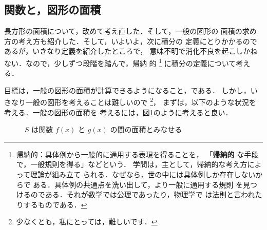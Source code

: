             \subsection{関数と，図形の面積}
                長方形の面積について，改めて考え直した．そして，一般の図形の
                面積の求め方の考え方も紹介した．そして，いよいよ，次に積分の
                定義にとりかかるのであるが，いきなり定義を紹介したところで，
                意味不明で消化不良を起こしかねない．なので，少しずつ段階を踏んで，帰納
                的
                    \footnote{
                        帰納的：具体例から一般的に通用する表現を得ることを，
                        「\textbf{帰納的} な手段で，一般規則を得る」などという．
                        学問は，主として，帰納的な考え方によって理論が組み立て
                        られる．なぜなら，世の中には具体例しか存在しないからで
                        ある．具体例の共通点を洗い出して，より一般に通用する規則
                        を見つけるのである．それが数学では公理であったり，物理学で
                        は法則と言われたりするものである．
                    }
                に積分の定義について考える．

                目標は，一般の図形の面積が計算できるようになること，である．
                しかし，いきなり一般の図形を考えることは難しいので
                    \footnote{
                        少なくとも，私にとっては，難しいです．
                    }，
                まずは，以下のような状況を考える．一般の図形の面積を
                考えるには，図\ref{fig:IntegFuncKangaeKata00}のように考えると良い．
                    \begin{figure}[hbt]
                        \begin{center}
                            \caption{$S$ は関数 $f(x)$ と $g(x)$ の間の面積とみなせる}
                            \label{fig:IntegFuncKangaeKata00}
                        \end{center}
                    \end{figure}

